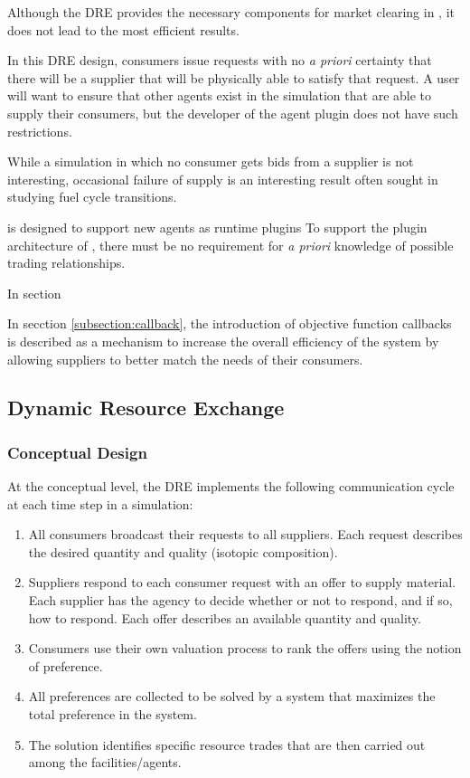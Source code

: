 Although the \gls{DRE} provides the necessary components for market clearing
in \Cyclus, it does not lead to the most efficient results.  

In this \gls{DRE} design, consumers issue requests with no \textit{a
  priori} certainty that there will be a supplier that will be physically able
to satisfy that request.  A user will want to ensure that other agents exist
in the simulation that are able to supply their consumers, but the developer
of the agent plugin does not have such restrictions.





While a simulation in which no consumer gets bids from
a supplier is not interesting, occasional failure of supply is an interesting
result often sought in studying fuel cycle transitions.


  \Cyclus is designed to support new agents as runtime plugins To support the plugin architecture of \Cyclus, there must
  be no requirement for \textit{a priori} knowledge of possible trading
  relationships.






In section 

In secction \ref{subsection:callback}, the introduction of objective function
callbacks is described as a mechanism to increase the overall efficiency of
the system by allowing suppliers to better match the needs of their consumers.

\subsection{Dynamic Resource Exchange}\label{subsection:dre}

\subsubsection{Conceptual Design}

At the conceptual level, the \gls{DRE} implements the following communication
cycle at each time step in a \Cyclus simulation:
\begin{enumerate}
\item All consumers broadcast their requests to all suppliers.  Each request
  describes the desired quantity and quality (isotopic composition).
\item Suppliers respond to each consumer request with an offer to supply
  material.  Each supplier has the agency to decide whether or not to respond,
  and if so, how to respond.  Each offer describes an available quantity and
  quality.
\item Consumers use their own valuation process to rank the offers using the
  notion of preference.
\item All preferences are collected to be solved by a system that maximizes
  the total preference in the system.
\item The solution identifies specific resource trades that are then carried
  out among the facilities/agents.
\end{enumerate}

